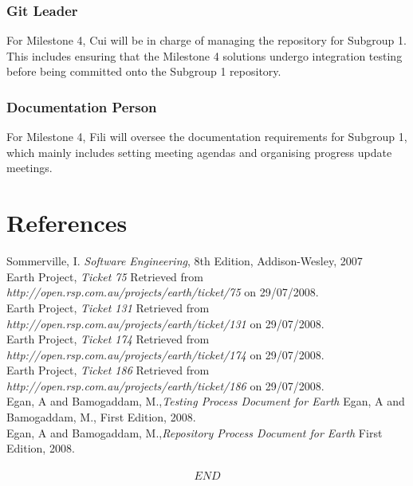 \documentclass[10pt,a4,oneside]{article}
\begin{document}
\subsubsection{Git Leader}

For Milestone 4, Cui will be in charge of managing the repository for Subgroup 1. This includes ensuring that the Milestone 4 solutions undergo integration testing before being committed onto the Subgroup 1 repository.


\subsubsection{Documentation Person}

For Milestone 4, Fili will oversee the documentation requirements for Subgroup 1, which mainly includes setting meeting agendas and organising progress update meetings.

\newpage

\section{References}
 
Sommerville, I. \textit{Software Engineering}, 8th Edition,  Addison-Wesley, 2007\\
\newline
Earth Project, \textit{Ticket 75} Retrieved from \emph{http://open.rsp.com.au/projects/earth/ticket/75} on 29/07/2008.\\
\newline
Earth Project, \textit{Ticket 131} Retrieved from \emph{http://open.rsp.com.au/projects/earth/ticket/131} on 29/07/2008.\\
\newline
Earth Project, \textit{Ticket 174} Retrieved from \emph{http://open.rsp.com.au/projects/earth/ticket/174} on 29/07/2008.\\
\newline
Earth Project, \textit{Ticket 186} Retrieved from \emph{http://open.rsp.com.au/projects/earth/ticket/186} on 29/07/2008.\\
\newline
Egan, A and Bamogaddam, M.,\textit{Testing Process Document for Earth} Egan, A and Bamogaddam, M., First Edition, 2008.\\
\newline
Egan, A and Bamogaddam, M.,\textit{Repository Process Document for Earth}  First Edition, 2008.\\

\paragraph{}

\[ END\]
\end{document}
